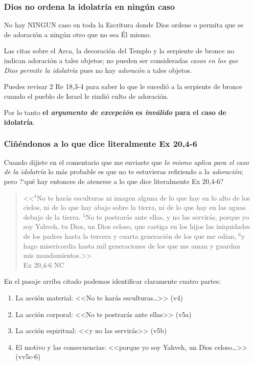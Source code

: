 \documentclass{article}
\begin{document}
\subsubsection{Dios no ordena la idolatr\'{i}a en ning\'un caso}

No hay NINGUN caso en toda la Escritura donde Dios ordene o permita que se de adoraci\'on a ning\'un otro que no sea \'El mismo.

Las citas sobre el Arca, la decoraci\'on del Templo y la serpiente de bronce no indican adoraci\'on a tales objetos; no pueden ser consideradas \emph{casos en los que Dios permite la idolatr\'{i}a} pues no hay \emph{adorac\'on} a tales objetos.

Puedes revisar 2 Re 18,3-4 para saber lo que le sucedi\'o a la serpiente de bronce cuando el pueblo de Israel le rindi\'o culto de adoraci\'on.

Por lo tanto \textbf{el \emph{argumento de excepci\'on} es \emph{inv\'alido} para el caso de idolatr\'{i}a}.

\subsubsection{Ci\~n\'endonos a lo que dice literalmente Ex 20,4-6}

Cuando dijiste en el comentario que me enviaste que \emph{lo mismo aplica para el caso de la idolatr\'{i}a} lo m\'as probable es que no te estuvieras refiriendo a la \emph{adoraci\'on}; pero ?`qu\'e hay entonces de atenerse a lo que dice literalmente Ex 20,4-6?

\begin{quote}
<<$^4$No te har\'as esculturas ni imagen alguna de lo que hay en lo alto de los cielos, ni de lo que hay abajo sobre la tierra, ni de lo que hay en las aguas debajo de la tierra. $^5$No te postrar\'as ante ellas, y no las servir\'as, porque yo soy Yahveh, tu Dios, un Dios celoso, que castiga en los hijos las iniquidades de los padres hasta la tercera y cuarta generaci\'on de los que me odian, $^6$y hago misericordia hasta mil generaciones de los que me aman y guardan mis mandamientos.>>\\ 
Ex 20,4-6 NC
\end{quote}

\noindent
En el pasaje arriba citado podemos identificar claramente cuatro partes:

\begin{enumerate}
\item La acci\'on material: <<No te har\'as esculturas\ldots>> (v4)
\item La acci\'on corporal: <<No te postrar\'as ante ellas>> (v5a)
\item La acci\'on espiritual: <<y no las servir\'as>> (v5b)
\item El motivo y las consecuencias: <<porque yo soy Yahveh, un Dios celoso\ldots>> (vv5c-6)
\end{enumerate}
\end{document}
